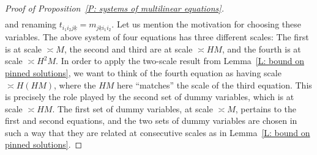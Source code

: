 \documentclass[11pt]{amsart}
\theoremstyle{definition}
\newcommand{\uk}{{\underline{k}}}
\begin{document}
\begin{proof}[Proof of Proposition~\ref{P: systems of multilinear equations}]
\begin{align*}
\end{align*}
and renaming $t_{i_1 i_2 j\uk} = m_{j\uk i_1 i_2}$.  Let us mention the motivation for choosing these variables.  The above system of four equations has three different scales: The first is at scale $\asymp M$, the second and third are at scale $\asymp HM$, and the fourth is at scale $\asymp H^2 M$.  In order to apply the two-scale result from Lemma~\ref{L: bound on pinned solutions}, we want to think of the fourth equation as having scale $\asymp H(HM)$, where the $HM$ here ``matches'' the scale of the third equation.  This is precisely the role played by the second set of dummy variables, which is at scale $\asymp HM$.  The first set of dummy variables, at scale $\asymp M$, pertains to the first and second equations, and the two sets of dummy variables are chosen in such a way that they are related at consecutive scales as in Lemma~\ref{L: bound on pinned solutions}. 


\end{proof}
\end{document}
